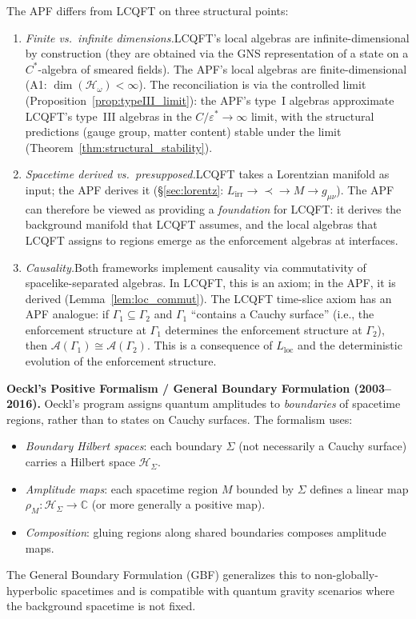 \documentclass[11pt,a4paper]{article}
\theoremstyle{definition}
\begin{document}
The APF differs from LCQFT on three structural points:
\begin{enumerate}[label=(\alph*),nosep]
  \item \textit{Finite vs.\ infinite dimensions.}\quad LCQFT's local
  algebras are infinite-dimensional by construction (they are obtained
  via the GNS representation of a state on a $C^*$-algebra of
  smeared fields).  The APF's local algebras are finite-dimensional
  (A1: $\dim(\mathcal{H}_\omega) < \infty$).  The reconciliation is
  via the controlled limit (Proposition~\ref{prop:typeIII_limit}):
  the APF's type~I algebras approximate LCQFT's type~III algebras
  in the $C/\varepsilon^* \to \infty$ limit, with the structural
  predictions (gauge group, matter content) stable under the limit
  (Theorem~\ref{thm:structural_stability}).
  \item \textit{Spacetime derived vs.\ presupposed.}\quad LCQFT takes
  a Lorentzian manifold as input; the APF derives it
  (\S\ref{sec:lorentz}: $L_{\mathrm{irr}} \to \prec \to M \to
  g_{\mu\nu}$).  The APF can therefore be viewed as providing a
  \emph{foundation} for LCQFT: it derives the background manifold
  that LCQFT assumes, and the local algebras that LCQFT assigns to
  regions emerge as the enforcement algebras at interfaces.
  \item \textit{Causality.}\quad Both frameworks implement causality
  via commutativity of spacelike-separated algebras.  In LCQFT, this
  is an axiom; in the APF, it is derived
  (Lemma~\ref{lem:loc_commut}).  The LCQFT time-slice axiom has an
  APF analogue: if $\Gamma_1 \subseteq \Gamma_2$ and $\Gamma_1$
  ``contains a Cauchy surface'' (i.e., the enforcement structure at
  $\Gamma_1$ determines the enforcement structure at $\Gamma_2$),
  then $\mathcal{A}(\Gamma_1) \cong \mathcal{A}(\Gamma_2)$.  This
  is a consequence of $L_{\mathrm{loc}}$ and the deterministic
  evolution of the enforcement structure.
\end{enumerate}

\smallskip\noindent\textbf{Oeckl's Positive Formalism / General
Boundary Formulation (2003--2016).}\quad
Oeckl's program assigns quantum amplitudes to \emph{boundaries} of
spacetime regions, rather than to states on Cauchy surfaces.  The
formalism uses:
\begin{itemize}[nosep]
  \item \textit{Boundary Hilbert spaces}: each boundary $\Sigma$
  (not necessarily a Cauchy surface) carries a Hilbert space
  $\mathcal{H}_\Sigma$.
  \item \textit{Amplitude maps}: each spacetime region $M$ bounded by
  $\Sigma$ defines a linear map $\rho_M: \mathcal{H}_\Sigma \to
  \mathbb{C}$ (or more generally a positive map).
  \item \textit{Composition}: gluing regions along shared boundaries
  composes amplitude maps.
\end{itemize}
The General Boundary Formulation (GBF) generalizes this to
non-globally-hyperbolic spacetimes and is compatible with quantum
gravity scenarios where the background spacetime is not fixed.
\end{document}
